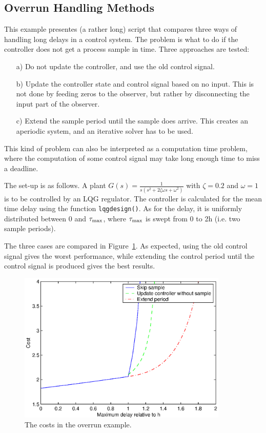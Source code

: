 \documentclass[final,twoside]{rapport}  %
\begin{document}
\subsection{Overrun Handling Methods}
This example presentes (a rather long) script that compares three ways
of handling long delays in a control system. The problem is what to do
if the controller does not get a process sample in time. Three
approaches are tested:
\begin{itemize}
  \item[a)] Do not update the controller, and use the old control signal.
  \item[b)] Update the controller state and control signal based on no
    input. This is not done by feeding zeros to the observer, but
    rather by disconnecting the input part of the observer. 
  \item[c)] Extend the sample period until the sample does arrive.
    This creates an aperiodic system, and an iterative solver
    has to be used.
\end{itemize}
This kind of problem can also be interpreted as a computation time
problem, where the computation of some control signal may take long
enough time to miss a deadline.

The set-up is as follows. A plant $G(s) = \frac{1}{s(s^2+2\zeta
  \omega s+\omega^2)}$ with $\zeta = 
0.2$ and $\omega=1$ is to be controlled by an LQG regulator. The
controller is calculated for the mean time
delay using the function {\tt lqgdesign()}. 
As for the delay, it is uniformly distributed between 0 and
$\tau_{\rm max}$, where $\tau_{\rm max}$ is swept from 0 to 2h (i.e.
two sample periods).

The three cases are compared in Figure~\ref{fig:overrun}. As expected,
using the old control signal gives the worst performance, while
extending the control period until the control signal is produced
gives the best results.

\begin{figure}
  \center
  \includegraphics[width=10cm]{overrun.eps}
  \caption{The costs in the overrun example.}
  \label{fig:overrun}
\end{figure}
\end{document}
